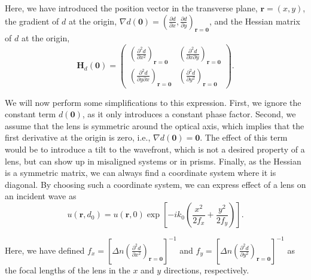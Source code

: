 \documentclass[a4paper,10pt]{article}
\begin{document}
Here, we have introduced the position vector in the transverse plane, $\mathbf{r} = (x,y)$, the gradient of $d$ at the origin, $\nabla d(\boldsymbol{0}) = \left( \frac{\partial d}{\partial x}, \frac{\partial d}{\partial y} \right)_{\mathbf{r} = \boldsymbol{0}}$, and the Hessian matrix of $d$ at the origin,
\begin{equation}
    \mathbf{H}_d(\boldsymbol{0}) = \begin{pmatrix}
    \left( \frac{\partial^2 d}{\partial x^2} \right)_{\mathbf{r} = \boldsymbol{0}} & \left( \frac{\partial^2 d}{\partial x \partial y} \right)_{\mathbf{r} = \boldsymbol{0}} \\
    \left( \frac{\partial^2 d}{\partial y \partial x} \right)_{\mathbf{r} = \boldsymbol{0}} & \left( \frac{\partial^2 d}{\partial y^2} \right)_{\mathbf{r} = \boldsymbol{0}}
    \end{pmatrix}.
\end{equation}

We will now perform some simplifications to this expression. First, we ignore the constant term $d(\boldsymbol{0})$, as it only introduces a constant phase factor. Second, we assume that the lens is symmetric around the optical axis, which implies that the first derivative at the origin is zero, i.e., $\nabla d(\boldsymbol{0}) = \boldsymbol{0}$. The effect of this term would be to introduce a tilt to the wavefront, which is not a desired property of a lens, but can show up in misaligned systems or in prisms. Finally, as the Hessian is a symmetric matrix, we can always find a coordinate system where it is diagonal. By choosing such a coordinate system, we can express effect of a lens on an incident wave as
\begin{equation}
    u(\mathbf{r}, d_0) = u(\mathbf{r}, 0) \exp \left[ -i k_0 \left( \frac{x^2}{2 f_x} + \frac{y^2}{2 f_y} \right) \right].
\end{equation}

Here, we have defined $f_x = \left[\Delta n\left(\frac{\partial^2 d}{\partial x^2} \right)_{\mathbf{r} = \boldsymbol{0}}\right]^{-1}$ and $f_y = \left[\Delta n\left(\frac{\partial^2 d}{\partial y^2} \right)_{\mathbf{r} = \boldsymbol{0}}\right]^{-1}$ as the focal lengths of the lens in the $x$ and $y$ directions, respectively.
\end{document}
